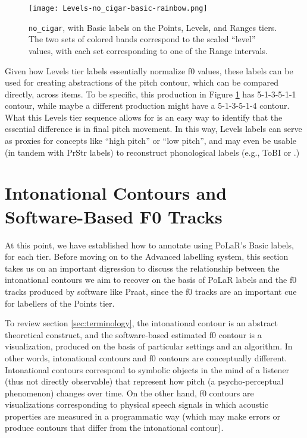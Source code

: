 \begin{figure}[H]
\centering
%
\texttt{[image: Levels-no\_cigar-basic-rainbow.png]}
%
\caption[\texttt{no\_cigar}, with Basic labels and overlaid colored bands.]{\texttt{no\_cigar}, with Basic labels on the Points, Levels, and Ranges tiers. The two sets of colored bands correspond to the scaled “level” values, with each set corresponding to one of the Range intervals.%
\label{fig:no_cigar Levels basic}%
%
}
\end{figure}


Given how Levels tier labels essentially normalize f0 values, these labels can be used for creating abstractions of the pitch contour, which can be compared directly, across items. To be specific, this production in Figure \ref{fig:no_cigar Levels basic} has 5-1-3-5-1-1 contour, while maybe a different production might have a 5-1-3-5-1-4 contour. What this Levels tier sequence allows for is an easy way to identify that the essential difference is in final pitch movement. In this way, Levels labels can serve as proxies for concepts like “high pitch” or “low pitch”, and may even be usable (in tandem with PrStr labels) to reconstruct phonological labels (e.g., ToBI  or .)

\section{Intonational Contours and Software-Based F0 Tracks}\label{sec:intonational-contours-and-software-based-pitch-tracks}

At this point, we have established how to annotate using PoLaR’s Basic labels, for each tier. Before moving on to the Advanced labelling system, this section takes us on an important digression to discuss the relationship between the intonational contours we aim to recover on the basis of PoLaR labels and the f0 tracks produced by software like Praat, since the f0 tracks are an important cue for labellers of the Points tier.

To review section \ref{sec:terminology}, the intonational contour is an abstract theoretical construct, and the software-based estimated f0 contour is a visualization, produced on the basis of particular settings and an algorithm. In other words, intonational contours and f0 contours are conceptually different. Intonational contours correspond to symbolic objects in the mind of a listener (thus not directly observable) that represent how pitch (a psycho-perceptual phenomenon) changes over time. On the other hand, f0 contours are visualizations corresponding to physical speech signals in which acoustic properties are measured in a programmatic way (which may make errors or produce contours that differ from the intonational contour).

